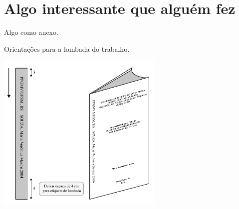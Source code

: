 \documentclass[oneside,openright,12pt]{ufsm_2021} %
\begin{document}
	
	\anexo    %
	
	\chapter{Algo interessante que alguém fez}
	\par Algo como anexo.
	\lipsum[2-10]
	
	\begin{grafico}[ht]
		\caption{\label{exepretex2}Orientações para a lombada do trabalho.}
		\centering
		\includegraphics[width=0.6\textwidth]{figuras/lombada.png}
	\end{grafico}         
	
	\lipsum[2-10]
	
	
	
\end{document}
